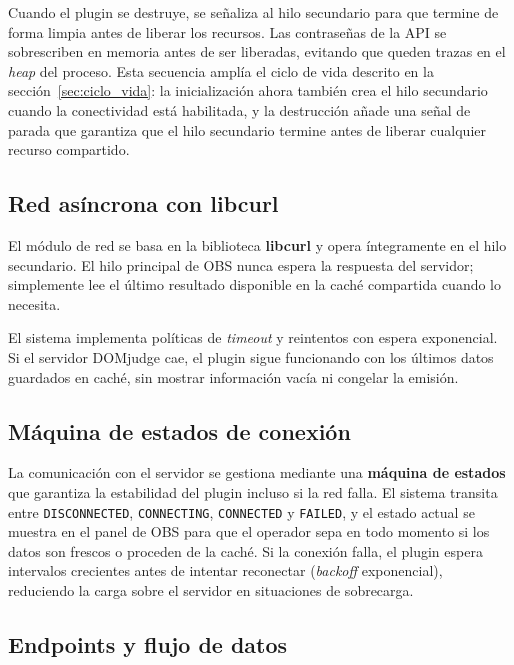 Cuando el plugin se destruye, se señaliza al hilo secundario para que termine de forma limpia
antes de liberar los recursos. Las contraseñas de la API se sobrescriben en memoria antes de
ser liberadas, evitando que queden trazas en el \textit{heap} del proceso. Esta secuencia amplía
el ciclo de vida descrito en la sección~\ref{sec:ciclo_vida}: la inicialización ahora también
crea el hilo secundario cuando la conectividad está habilitada, y la destrucción añade una señal
de parada que garantiza que el hilo secundario termine antes de liberar cualquier recurso
compartido.
 
 
\subsection{Red asíncrona con libcurl}
\label{subsec:libcurl}
 
El módulo de red se basa en la biblioteca \textbf{libcurl} y opera íntegramente en el hilo
secundario. El hilo principal de OBS nunca espera la respuesta del servidor; simplemente lee el
último resultado disponible en la caché compartida cuando lo necesita.
 
El sistema implementa políticas de \textit{timeout} y reintentos con espera exponencial. Si el
servidor DOMjudge cae, el plugin sigue funcionando con los últimos datos guardados en caché, sin
mostrar información vacía ni congelar la emisión.
 
 
\subsection{Máquina de estados de conexión}
\label{subsec:estados_conexion}
 
La comunicación con el servidor se gestiona mediante una \textbf{máquina de estados} que
garantiza la estabilidad del plugin incluso si la red falla. El sistema transita entre
\texttt{DISCONNECTED}, \texttt{CONNECTING}, \texttt{CONNECTED} y \texttt{FAILED}, y el estado
actual se muestra en el panel de OBS para que el operador sepa en todo momento si los datos son
frescos o proceden de la caché. Si la conexión falla, el plugin espera intervalos crecientes
antes de intentar reconectar (\textit{backoff} exponencial), reduciendo la carga sobre el
servidor en situaciones de sobrecarga.
 
 
\subsection{Endpoints y flujo de datos}
\label{subsec:endpoints}
 
